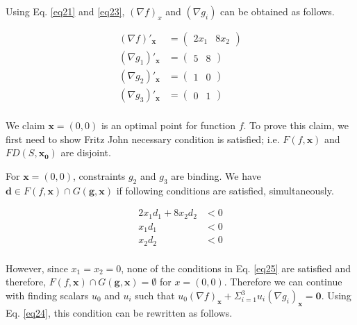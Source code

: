 Using Eq. \ref{eq21} and \ref{eq23}, $(\nabla f)_x$ and $(\nabla g_i)$ can be obtained as follows.

\begin{equation}
\begin{aligned}
(\nabla f)'_\mathbf{x} &= \begin{pmatrix} 2x_1 & 8x_2\end{pmatrix} \\
(\nabla g_1)'_\mathbf{x} &= \begin{pmatrix} 5 & 8\end{pmatrix} \\
(\nabla g_2)'_\mathbf{x} &= \begin{pmatrix} 1 & 0\end{pmatrix} \\
(\nabla g_3)'_\mathbf{x} &= \begin{pmatrix} 0 & 1\end{pmatrix} \\
\end{aligned}
\label{eq24}
\end{equation}

We claim $\mathbf{x} = (0,0)$ is an optimal point for function $f$. To prove this claim, we first need to show Fritz John necessary condition is satisfied; i.e. $F(f,\mathbf{x})$ and $FD(S,\mathbf{x_0})$ are disjoint.

For $\mathbf{x} = (0,0)$, constraints $g_2$ and $g_3$ are binding. We have $\mathbf{d} \in F(f,\mathbf{x}) \cap G(\mathbf{g}, \mathbf{x})$ if following conditions are satisfied, simultaneously.

\begin{equation}
\begin{aligned}
2x_1 d_1 + 8x_2 d_2 &< 0\\
x_1 d_1 &< 0\\
x_2 d_2 &< 0\\
\end{aligned}
\label{eq25}
\end{equation}

However, since $x_1 = x_2 = 0$, none of the conditions in Eq. \ref{eq25} are satisfied and therefore, $F(f,\mathbf{x}) \cap G(\mathbf{g}, \mathbf{x}) = \emptyset$ for $x = (0,0)$. Therefore we can continue with finding scalars $u_0$ and $u_i$ such that $u_0(\nabla f)_\mathbf{x} + \Sigma_{i=1}^{3} u_i (\nabla g_i)_\mathbf{x} = \mathbf{0}$. Using Eq. \ref{eq24}, this condition can be rewritten as follows.

